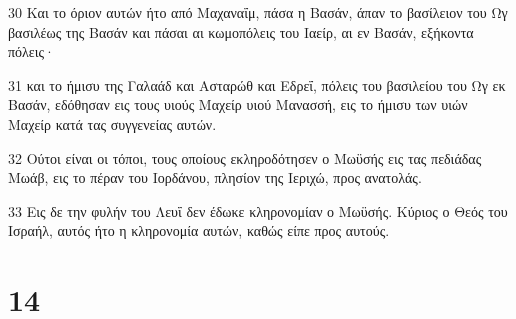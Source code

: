 \par 30 Και το όριον αυτών ήτο από Μαχαναΐμ, πάσα η Βασάν, άπαν το βασίλειον του Ωγ βασιλέως της Βασάν και πάσαι αι κωμοπόλεις του Ιαείρ, αι εν Βασάν, εξήκοντα πόλεις·
\par 31 και το ήμισυ της Γαλαάδ και Ασταρώθ και Εδρεΐ, πόλεις του βασιλείου του Ωγ εκ Βασάν, εδόθησαν εις τους υιούς Μαχείρ υιού Μανασσή, εις το ήμισυ των υιών Μαχείρ κατά τας συγγενείας αυτών.
\par 32 Ούτοι είναι οι τόποι, τους οποίους εκληροδότησεν ο Μωϋσής εις τας πεδιάδας Μωάβ, εις το πέραν του Ιορδάνου, πλησίον της Ιεριχώ, προς ανατολάς.
\par 33 Εις δε την φυλήν του Λευΐ δεν έδωκε κληρονομίαν ο Μωϋσής. Κύριος ο Θεός του Ισραήλ, αυτός ήτο η κληρονομία αυτών, καθώς είπε προς αυτούς.

\chapter{14}

